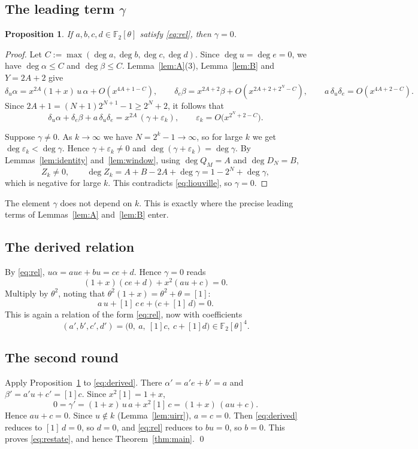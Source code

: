\documentclass[11pt]{amsart}
\newtheorem{proposition}[theorem]{Proposition}
\theoremstyle{remark}
\numberwithin{equation}{section}
\newcommand{\F}{\mathbb{F}}
\begin{document}
\subsection{The leading term \texorpdfstring{$\gamma$}{gamma}}

\begin{proposition}\label{prop:gamma}
If $a,b,c,d\in\F_2[\theta]$ satisfy \eqref{eq:rel}, then $\gamma=0$.
\end{proposition}

\begin{proof}
Let $C:=\max(\deg a,\deg b,\deg c,\deg d)$. Since $\deg u=\deg e=0$, we have $\deg\alpha\le C$ and $\deg\beta\le C$. Lemma~\ref{lem:A}(3), Lemma~\ref{lem:B} and $Y=2A+2$ give
\[
\delta_u\alpha=x^{2A}(1+x)\,u\,\alpha+O(x^{4A+1-C}),\qquad
\delta_e\beta=x^{2A+2}\beta+O(x^{2A+2+2^N-C}),\qquad
a\,\delta_u\delta_e=O(x^{4A+2-C}).
\]
Since $2A+1=(N+1)2^{N+1}-1\ge2^N+2$, it follows that
\[
\delta_u\alpha+\delta_e\beta+a\,\delta_u\delta_e=x^{2A}\,(\gamma+\varepsilon_k),\qquad \varepsilon_k=O\bigl(x^{2^N+2-C}\bigr).
\]

Suppose $\gamma\ne0$. As $k\to\infty$ we have $N=2^k-1\to\infty$, so for large $k$ we get $\deg\varepsilon_k<\deg\gamma$. Hence $\gamma+\varepsilon_k\ne0$ and $\deg(\gamma+\varepsilon_k)=\deg\gamma$. By Lemmas~\ref{lem:identity} and~\ref{lem:window}, using $\deg Q_M=A$ and $\deg D_N=B$,
\[
Z_k\ne0,\qquad \deg Z_k=A+B-2A+\deg\gamma=1-2^N+\deg\gamma ,
\]
which is negative for large $k$. This contradicts \eqref{eq:liouville}, so $\gamma=0$.
\end{proof}

The element $\gamma$ does not depend on $k$. This is exactly where the precise leading terms of Lemmas~\ref{lem:A} and~\ref{lem:B} enter.

\subsection{The derived relation}
By \eqref{eq:rel}, $u\alpha=aue+bu=ce+d$. Hence $\gamma=0$ reads
\[
(1+x)(ce+d)+x^2(au+c)=0 .
\]
Multiply by $\theta^2$, noting that $\theta^2(1+x)=\theta^2+\theta=[1]$:
\begin{equation}\label{eq:derived}
a\,u+[1]\,c\,e+\bigl(c+[1]\,d\bigr)=0 .
\end{equation}
This is again a relation of the form \eqref{eq:rel}, now with coefficients
\[
(a',b',c',d')=\bigl(0,\ a,\ [1]c,\ c+[1]d\bigr)\in\F_2[\theta]^4 .
\]

\subsection{The second round}
Apply Proposition~\ref{prop:gamma} to \eqref{eq:derived}. There $\alpha'=a'e+b'=a$ and $\beta'=a'u+c'=[1]c$. Since $x^2[1]=1+x$,
\[
0=\gamma'=(1+x)\,u\,a+x^2[1]\,c=(1+x)\,(au+c).
\]
Hence $au+c=0$. Since $u\notin k$ (Lemma~\ref{lem:uirr}), $a=c=0$. Then \eqref{eq:derived} reduces to $[1]\,d=0$, so $d=0$, and \eqref{eq:rel} reduces to $bu=0$, so $b=0$. This proves \eqref{eq:restate}, and hence Theorem~\ref{thm:main}. \qed
\end{document}
